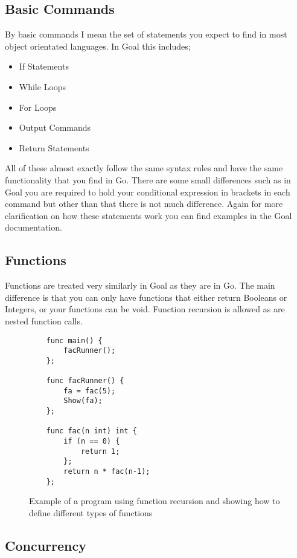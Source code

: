 \subsection{Basic Commands}

By basic commands I mean the set of statements you expect to find in most object orientated languages. In Goal this includes;

\begin{itemize}
	\item If Statements
	\item While Loops
	\item For Loops
	\item Output Commands
	\item Return Statements 
\end{itemize}

All of these almost exactly follow the same syntax rules and have the same functionality that you find in Go. There are some small differences such as in Goal you are required to hold your conditional expression in brackets in each command but other than that there is not much difference. Again for more clarification on how these statements work you can find examples in the Goal documentation.

\subsection{Functions}

Functions are treated very similarly in Goal as they are in Go. The main difference is that you can only have functions that either return Booleans or Integers, or your functions can be void. Function recursion is allowed as are nested function calls.

\begin{figure}
\begin{lstlisting}
	func main() {
	    facRunner();
	};
	
	func facRunner() {
	    fa = fac(5);
	    Show(fa);
	};
	
	func fac(n int) int {
	    if (n == 0) {
	        return 1;
	    }; 
	    return n * fac(n-1);
	};
\end{lstlisting}
\caption{Example of a program using function recursion and showing how to define different types of functions}
\label{fig:egGoalFunction} 
\end{figure}

\subsection{Concurrency}
\label{sec:concDes}

